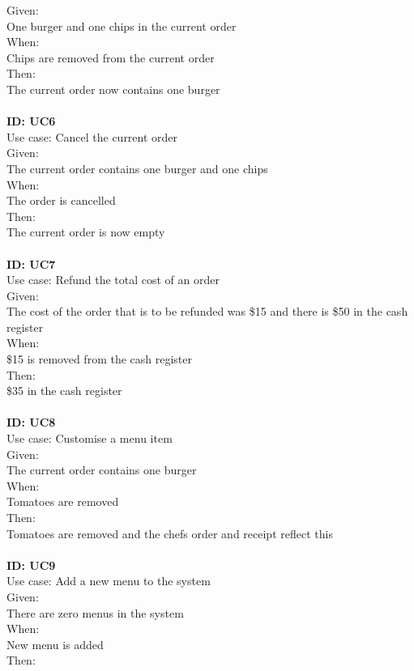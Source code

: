 Given: \\
One burger and one chips in the current order\\
When: \\
Chips are removed from the current order\\
Then:\\
The current order now contains one burger\\
\\
\textbf{ID: UC6\\}
Use case: Cancel the current order\\
Given: \\
The current order contains one burger and one chips\\
When: \\
The order is cancelled\\
Then:\\
The current order is now empty\\
\\
\textbf{ID: UC7\\}
Use case: Refund the total cost of an order\\
Given: \\
The cost of the order that is to be refunded was \$15 and there is \$50 in the cash register\\
When: \\
\$15 is removed from the cash register\\
Then:\\
\$35 in the cash register\\
\\
\textbf{ID: UC8\\}
Use case: Customise a menu item\\
Given: \\
The current order contains one burger\\
When: \\
Tomatoes are removed\\
Then:\\
Tomatoes are removed and the chefs order and receipt reflect this\\
\\
\textbf{ID: UC9\\}
Use case: Add a new menu to the system\\
Given: \\
There are zero menus in the system\\
When: \\
New menu is added\\
Then:\\
